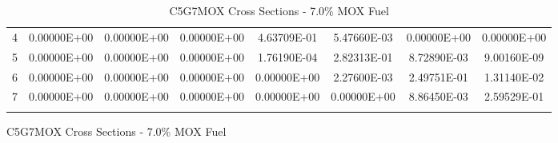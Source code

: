 \begin{figure}
\begin{table}[H]
\begin{subtable}[h]{1.0\textwidth}
{\begin{tabular}{*8c}
4 &	0.00000E+00	 &	0.00000E+00 &	0.00000E+00 &	4.63709E-01 &	5.47660E-03 &	0.00000E+00 &	0.00000E+00 \\
5 &	0.00000E+00	 &	0.00000E+00 &	0.00000E+00 &	1.76190E-04 &	2.82313E-01 &	8.72890E-03 &	9.00160E-09 \\
6 &	0.00000E+00	 &	0.00000E+00 &	0.00000E+00 &	0.00000E+00 &	2.27600E-03 &	2.49751E-01 &	1.31140E-02 \\
7 &	0.00000E+00	 &	0.00000E+00 &	0.00000E+00 &	0.00000E+00 &	0.00000E+00 &	8.86450E-03 &	2.59529E-01 \\
        \bottomrule
        & & & & & & & 
    \end{tabular}}
  \end{subtable}
  \caption{C5G7MOX Cross Sections - 7.0\% MOX Fuel}
\end{table}
\end{figure}

